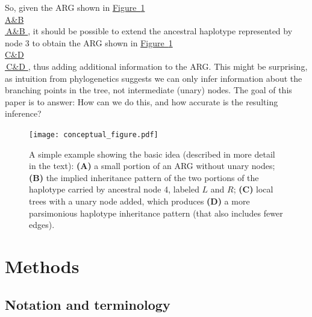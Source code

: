 \documentclass[10pt,twoside,lineno]{gsajnl}
\newcommand*{\figref}[2][]{%
	\hyperref[{#2}]{%
		Figure~\ref*{#2}%
		\ifx\\#1\\%
		\else
		\,#1%
		\fi
	}%
}
\begin{document}
So, given the ARG shown in \figref[A\&B]{fig:conceptual},
it should be possible to extend the ancestral haplotype represented by node 3
to obtain the ARG shown in \figref[C\&D]{fig:conceptual},
thus adding additional information to the ARG.
This might be surprising,
as intuition from phylogenetics suggests we can only infer
information about the branching points in the tree, not intermediate (unary) nodes.
The goal of this paper is to answer:
How can we do this, and how accurate is the resulting inference?

\begin{figure}
    \begin{center}
    \texttt{[image: conceptual\_figure.pdf]}
    \end{center}
    \caption{
        A simple example showing the basic idea
        (described in more detail in the text):
        \textbf{(A)} a small portion of an ARG without unary nodes;
        \textbf{(B)} the implied inheritance pattern of the two portions of the haplotype carried by ancestral node 4,
        labeled $L$ and $R$;
        \textbf{(C)} local trees with a unary node added,
        which produces \textbf{(D)} a more parsimonious haplotype inheritance pattern
        (that also includes fewer edges).
        \label{fig:conceptual}
    }
\end{figure}

\section{Methods}

\subsection{Notation and terminology}
\end{document}
